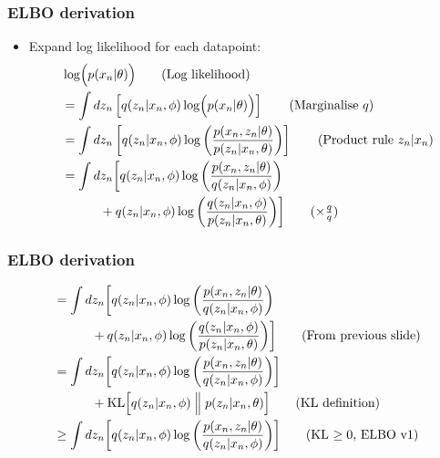 \documentclass[xcolor=table,dvipsnames]{beamer}
\begin{document}
\begin{frame}[t]
    \frametitle{ELBO derivation}
    \begin{itemize}
        \item Expand log likelihood for each datapoint:
        \begin{align*}
            & \log\Bigl(p(x_n \vert \theta)\Bigr) \tag{Log likelihood} \\
            &= \int dz_n \left[ q(z_n \vert x_n, \phi) \log\Bigl(p(x_n \vert \theta)\Bigr) \right] \tag{Marginalise $q$} \\
            &= \int dz_n \left[ q(z_n \vert x_n, \phi) \log\left( \frac{p(x_n, z_n \vert \theta)}{p(z_n \vert x_n, \theta)} \right) \right] \tag{Product rule $z_n \vert x_n$} \\
            &= \int dz_n \biggl[ q(z_n \vert x_n, \phi) \log\left( \frac{p(x_n, z_n \vert \theta)}{q(z_n \vert x_n, \phi)} \right) \\
            &\qquad\quad + q(z_n \vert x_n, \phi) \log\left( \frac{q(z_n \vert x_n, \phi)}{p(z_n \vert x_n, \theta)} \right) \biggr] \tag{$\times\frac{q}{q}$}
        \end{align*}
    \end{itemize}
\end{frame}

\begin{frame}[t]
    \frametitle{ELBO derivation}
    \begin{align*}
        &= \int dz_n \biggl[ q(z_n \vert x_n, \phi) \log\left( \frac{p(x_n, z_n \vert \theta)}{q(z_n \vert x_n, \phi)} \right) \\
        &\qquad\quad + q(z_n \vert x_n, \phi) \log\left( \frac{q(z_n \vert x_n, \phi)}{p(z_n \vert x_n, \theta)} \right) \biggr] \tag{From previous slide} \\
        &= \int dz_n \biggl[ q(z_n \vert x_n, \phi) \log\left( \frac{p(x_n, z_n \vert \theta)}{q(z_n \vert x_n, \phi)} \right) \biggr] \\
        &\qquad\quad + \text{KL}\Bigl[q(z_n \vert x_n, \phi) \Bigm\Vert p(z_n \vert x_n, \theta)\Bigr] \tag{KL definition} \\
        &\ge \int dz_n \biggl[ q(z_n \vert x_n, \phi) \log\left( \frac{p(x_n, z_n \vert \theta)}{q(z_n \vert x_n, \phi)} \right) \biggr] \tag{KL $\ge 0$, ELBO v1}
    \end{align*}
\end{frame}
\end{document}
